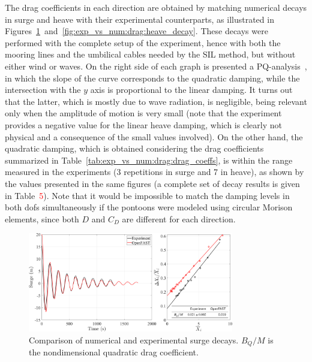 The drag coefficients in each direction are obtained by matching numerical decays in surge and heave with their experimental counterparts, as illustrated in Figures~\ref{fig:exp_vs_num:drag:surge_decay}~and~\ref{fig:exp_vs_num:drag:heave_decay}. These decays were performed with the complete setup of the experiment, hence with both the mooring lines and the umbilical cables needed by the SIL method, but without either wind or waves. On the right side of each graph is presented a PQ-analysis~\citep{burmester2020}, in which the slope of the curve corresponds to the quadratic damping, while the intersection with the $y$ axis is proportional to the linear damping. It turns out that the latter, which is mostly due to wave radiation, is negligible, being relevant only when the amplitude of motion is very small (note that the experiment provides a negative value for the linear heave damping, which is clearly not physical and a consequence of the small values involved). On the other hand, the quadratic damping, which is obtained considering the drag coefficients summarized in Table~\ref{tab:exp_vs_num:drag:drag_coeffs}, is within the range measured in the experiments (3 repetitions in surge and 7 in heave), as shown by the values presented in the same figures (a complete set of decay results is given in Table~\textcolor{red}{5}). Note that it would be impossible to match the damping levels in both dofs simultaneously if the pontoons were modeled using circular Morison elements, since both $D$ and $C_D$ are different for each direction. 
\begin{figure}[!hbtp]
	\centering
	\includegraphics[width=0.80\textwidth]{./figures/surge_decay_drag_pontoon.png}%
	\caption{Comparison of numerical and experimental surge decays. $B_Q/M$ is the nondimensional quadratic drag coefficient.} \label{fig:exp_vs_num:drag:surge_decay}%
\end{figure}%

